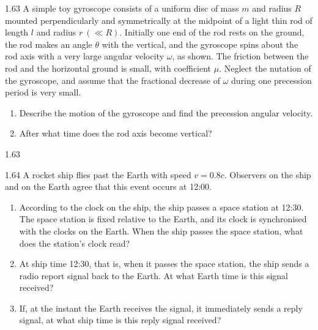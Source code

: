\begin{problem}{1.63}
A simple toy gyroscope consists of a uniform disc of mass $m$ and radius $R$ mounted perpendicularly and symmetrically at the midpoint of a light thin rod of length $l$ and radius $r\ (\ll R)$. Initially one end of the rod rests on the ground, the rod makes an angle $\theta$ with the vertical, and the gyroscope spins about the rod axis with a very large angular velocity $\omega$, as shown. The friction between the rod and the horizontal ground is small, with coefficient $\mu$. Neglect the nutation of the gyroscope, and assume that the fractional decrease of $\omega$ during one precession period is very small.
\begin{enumerate}[label=(\arabic*),leftmargin=2.2em,itemsep=1pt,topsep=2pt]
\item Describe the motion of the gyroscope and find the precession angular velocity.
\item After what time does the rod axis become vertical?
\end{enumerate}
\end{problem}

\begin{figbox}{1.63}
\end{figbox}

\begin{problem}{1.64}
A rocket ship flies past the Earth with speed $v=0.8c$. Observers on the ship and on the Earth agree that this event occurs at 12:00.
\begin{enumerate}[label=(\arabic*),leftmargin=2.2em,itemsep=1pt,topsep=2pt]
\item According to the clock on the ship, the ship passes a space station at 12:30. The space station is fixed relative to the Earth, and its clock is synchronised with the clocks on the Earth. When the ship passes the space station, what does the station's clock read?
\item At ship time 12:30, that is, when it passes the space station, the ship sends a radio report signal back to the Earth. At what Earth time is this signal received?
\item If, at the instant the Earth receives the signal, it immediately sends a reply signal, at what ship time is this reply signal received?
\end{enumerate}
\end{problem}

